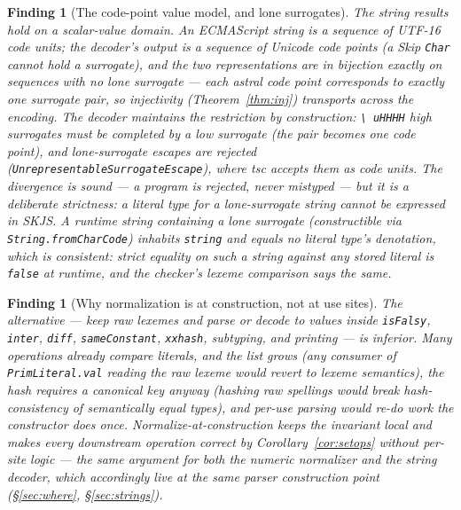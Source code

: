 \documentclass[11pt]{article}
\newtheorem{finding}[theorem]{Finding}
\begin{document}
\begin{finding}[The code-point value model, and lone surrogates]
\label{find:surrogates}
The string results hold on a \emph{scalar-value} domain. An ECMAScript
string is a sequence of UTF-16 code units; the decoder's output is a
sequence of Unicode code points (a Skip \texttt{Char} cannot hold a
surrogate), and the two representations are in bijection exactly on
sequences with no lone surrogate --- each astral code point corresponds
to exactly one surrogate pair, so injectivity
(Theorem~\ref{thm:inj}) transports across the encoding. The decoder
maintains the restriction by construction: \texttt{\textbackslash
uHHHH} high surrogates must be completed by a low surrogate (the pair
becomes one code point), and lone-surrogate escapes are rejected
(\texttt{UnrepresentableSurrogateEscape}), where tsc accepts them as
code units. The divergence is sound --- a program is rejected, never
mistyped --- but it is a deliberate strictness: a literal type for a
lone-surrogate string cannot be expressed in SKJS. A runtime string
containing a lone surrogate (constructible via
\texttt{String.fromCharCode}) inhabits \texttt{string} and equals no
literal type's denotation, which is consistent: strict equality on such
a string against any stored literal is \texttt{false} at runtime, and
the checker's lexeme comparison says the same.
\end{finding}

\begin{finding}[Why normalization is at construction, not at use sites]
\label{find:usesite}
The alternative --- keep raw lexemes and parse or decode to values inside
\texttt{isFalsy}, \texttt{inter}, \texttt{diff}, \texttt{sameConstant},
\texttt{xxhash}, subtyping, and printing --- is inferior. Many operations
already compare literals, and the list grows (any consumer of
\texttt{PrimLiteral.val}
reading the raw lexeme would revert to lexeme semantics), the hash
requires a canonical key anyway (hashing raw spellings would break
hash-consistency of semantically equal types), and per-use parsing would
re-do work the constructor does once. Normalize-at-construction keeps the
invariant local and makes every downstream operation correct by
Corollary~\ref{cor:setops} without per-site logic --- the same argument
for both the numeric normalizer and the string decoder, which
accordingly live at the same parser construction point
(\S\ref{sec:where}, \S\ref{sec:strings}).
\end{finding}
\end{document}
